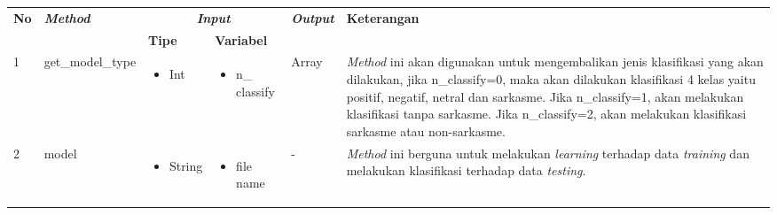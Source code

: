\begin{table}[H]
	\centering
	\small
	\begin{adjustbox}{width=1\textwidth}
	\begin{tabular}{|p{0.4cm}|p{3.2cm}|p{1.4cm}|p{1.7cm}|p{1.20cm}|p{3.35cm}|}
		\hline
		\multirow{2}{*}{\textbf{No}} & \multirow{2}{*}{\textit{\textbf{Method}}} & \multicolumn{2}{c|}{\textit{\textbf{Input}}} & \multirow{2}{*}{\textit{\textbf{Output}}} & 
		\multirow{2}{*}{\textbf{Keterangan}}\\
		\cline{3-4}
		& & \textbf{Tipe} & \textbf{Variabel} & & \\
		\hline
		1 & get\_model\_type & \begin{itemize}[leftmargin=*,label={-}]
			\item Int\end{itemize}
		& \begin{itemize}[leftmargin=*,label={-}]
			\item n\_ classify\end{itemize}
		& Array & \textit{Method} ini akan digunakan untuk mengembalikan jenis 		klasifikasi yang akan dilakukan, jika n\_classify=0, maka akan dilakukan klasifikasi 4 kelas yaitu positif, negatif, netral dan sarkasme. Jika n\_classify=1, akan melakukan klasifikasi tanpa sarkasme. Jika n\_classify=2, akan melakukan klasifikasi sarkasme atau non-sarkasme. \\
		\hline
		2 & model & \begin{itemize}[leftmargin=*,label={-}]
			\item String\end{itemize}
		& \begin{itemize}[leftmargin=*,label={-}]
			\item file name\end{itemize}
		& - & \textit{Method} ini berguna untuk melakukan \textit{learning}	terhadap data \textit{training} dan melakukan klasifikasi terhadap data \textit{testing}. \\
		\hline
	\end{tabular}
	\end{adjustbox}
\end{table}
